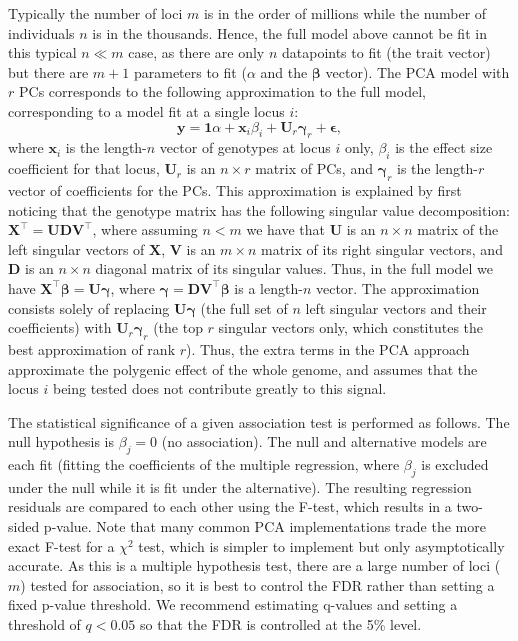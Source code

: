 \documentclass[11pt]{article}
\begin{document}
Typically the number of loci $m$ is in the order of millions while the number of individuals $n$ is in the thousands.
Hence, the full model above cannot be fit in this typical $n \ll m$ case, as there are only $n$ datapoints to fit (the trait vector) but there are $m+1$ parameters to fit ($\alpha$ and the $\mathbf{\beta}$ vector).
The PCA model with $r$ PCs corresponds to the following approximation to the full model, corresponding to a model fit at a single locus $i$:
\begin{equation}
  \label{eq:pca_gwas}
  \mathbf{y}
  =
  \mathbf{1} \alpha + \mathbf{x}_i \beta_i + \mathbf{U}_r \mathbf{\gamma}_r + \mathbf{\epsilon}
  ,
\end{equation}
where $\mathbf{x}_i$ is the length-$n$ vector of genotypes at locus $i$ only,
$\beta_i$ is the effect size coefficient for that locus,
$\mathbf{U}_r$ is an $n \times r$ matrix of PCs, and
$\mathbf{\gamma}_r$ is the length-$r$ vector of coefficients for the PCs.
This approximation is explained by first noticing that the genotype matrix has the following singular value decomposition:
$\mathbf{X}^\intercal = \mathbf{U} \mathbf{D} \mathbf{V}^\intercal$,
where assuming $n < m$ we have that
$\mathbf{U}$ is an $n \times n$ matrix of the left singular vectors of $\mathbf{X}$,
$\mathbf{V}$ is an $m \times n$ matrix of its right singular vectors, and
$\mathbf{D}$ is an $n \times n$ diagonal matrix of its singular values.
Thus, in the full model we have
$\mathbf{X}^\intercal \mathbf{\beta} = \mathbf{U} \mathbf{\gamma}$,
where
$\mathbf{\gamma} = \mathbf{D} \mathbf{V}^\intercal \mathbf{\beta}$ is a length-$n$ vector.
The approximation consists solely of replacing $\mathbf{U} \mathbf{\gamma}$ (the full set of $n$ left singular vectors and their coefficients) with $\mathbf{U}_r \mathbf{\gamma}_r$ (the top $r$ singular vectors only, which constitutes the best approximation of rank $r$).
Thus, the extra terms in the PCA approach approximate the polygenic effect of the whole genome, and assumes that the locus $i$ being tested does not contribute greatly to this signal.

The statistical significance of a given association test is performed as follows.
The null hypothesis is $\beta_j = 0$ (no association).
The null and alternative models are each fit (fitting the coefficients of the multiple regression, where $\beta_j$ is excluded under the null while it is fit under the alternative).
The resulting regression residuals are compared to each other using the F-test, which results in a two-sided p-value.
Note that many common PCA implementations trade the more exact F-test for a $\chi^2$ test, which is simpler to implement but only asymptotically accurate.
As this is a multiple hypothesis test, there are a large number of loci ($m$) tested for association, so it is best to control the FDR rather than setting a fixed p-value threshold.
We recommend estimating q-values and setting a threshold of $q < 0.05$ so that the FDR is controlled at the 5\% level.
\end{document}
